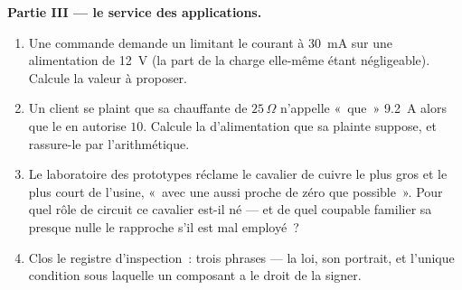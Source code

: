 \begin{problem}
\medskip\noindent\textbf{Partie III --- le service des
applications.}
\begin{enumerate}[resume]
  \item Une commande demande un  limitant le courant à
        \qty{30}{mA} sur une alimentation de \qty{12}{V} (la part
        de la charge elle-même étant négligeable). Calcule la
        valeur à proposer.
  \item Un client se plaint que sa  chauffante de
        $25\,\Omega$ n'appelle «~que~» \qty{9.2}{A} alors que le
         en autorise $10$. Calcule la  d'alimentation
        que sa plainte suppose, et rassure-le par l'arithmétique.
  \item Le laboratoire des prototypes réclame le cavalier de cuivre
        le plus gros et le plus court de l'usine, «~avec une
         aussi proche de zéro  que possible~». Pour
        quel rôle de circuit ce cavalier est-il né --- et de quel
        coupable familier sa  presque nulle le rapproche
        s'il est mal employé~?
  \item Clos le registre d'inspection~: trois phrases --- la loi,
        son portrait, et l'unique condition sous laquelle un
        composant a le droit de la signer.
\end{enumerate}
\end{problem}
